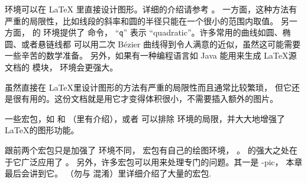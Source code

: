  环境可以在 \LaTeX{} 里直接设计图形。详细的介绍请参考 \manual。
一方面，这种方法有严重的局限性，比如线段的斜率和圆的半径只能在一个很小的范围内取值。
另一方面， \LaTeXe 的  环境提供了  命令，
``\texttt{q}'' 表示 ``quadratic''。许多常用的曲线如圆、椭圆、或者悬链线都
可以用二次 B\'ezier 曲线得到令人满意的近似，虽然这可能需要一些辛苦的数学准备。
另外，如果有一种编程语言如 Java 能用来生成 \LaTeX 源文档的  模块，
 环境会更强大。

%
%

虽然直接在 \LaTeX 里设计图形的方法有严重的局限性而且通常比较繁琐，
但它还是很有用的。这份文档就是用它才变得体积很小，不需要插入额外的图片。

一些宏包，如  和 （\companion 里有介绍），或者
  可以排除  环境的局限，并大大地增强了 \LaTeX 的图形功能。

跟前两个宏包只是加强了  环境不同， 宏包有自己的绘图环境，
。  的强大之处在于它广泛应用了 \PSi{}。
另外，许多宏包可以用来处理专门的问题。其一是 \texorpdfstring{\Xy}{Xy}-pic，
本章最后会讲到它。
\graphicscompanion{} （勿与 \companion 混淆）里详细介绍了大量的宏包.
%

